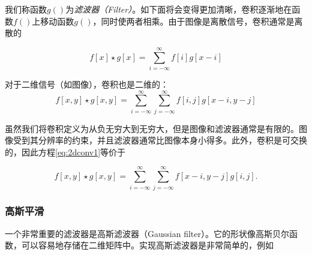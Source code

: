 
我们称函数$g()$为\emph{滤波器（Filter）}。如下面将会变得更加清晰，卷积逐渐地在函数$f()$上移动函数$g()$，同时使两者相乘。由于图像是离散信号，卷积通常是离散的

\begin{equation}
f[x]\star g[x]=\sum_{i=-\infty}^{\infty}f[i]g[x-i]
\end{equation} 


对于二维信号（如图像），卷积也是二维的：
\begin{equation}\label{eq:2dconv1}
f[x,y]\star g[x,y]=\sum_{i=-\infty}^{\infty}\sum_{j=-\infty}^{\infty}f[i,j]g[x-i,y-j]
\end{equation}


虽然我们将卷积定义为从负无穷大到无穷大，但是图像和滤波器通常是有限的。图像受到其分辨率的约束，并且滤波器通常比图像本身小得多。此外，卷积是可交换的，因此方程\ref{eq:2dconv1}等价于

\begin{equation}\label{eq:2dconv2}
f[x,y]\star g[x,y]=\sum_{i=-\infty}^{\infty}\sum_{j=-\infty}^{\infty}f[x-i,y-j]g[i,j].
\end{equation}


\subsubsection{高斯平滑}
一个非常重要的滤波器是高斯滤波器（Gaussian filter）。它的形状像高斯贝尔函数，可以容易地存储在二维矩阵中。实现高斯滤波器是非常简单的，例如


